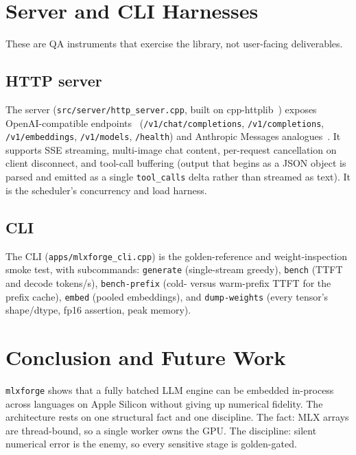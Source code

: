 \documentclass[11pt,a4paper]{report}
\newcommand{\code}[1]{\texttt{#1}}
\begin{document}
\chapter{Server and CLI Harnesses}
\label{ch:apps}

These are QA instruments that exercise the library, not user-facing deliverables.

\section{HTTP server}
The server (\code{src/server/http\_server.cpp}, built on
cpp-httplib~\citep{cpphttplib}) exposes OpenAI-compatible
endpoints~\citep{openai_api} (\code{/v1/chat/completions}, \code{/v1/completions},
\code{/v1/embeddings}, \code{/v1/models}, \code{/health}) and Anthropic Messages
analogues~\citep{anthropic_messages_api}. It supports SSE streaming, multi-image
chat content, per-request cancellation on client disconnect, and tool-call
buffering (output that begins as a JSON object is parsed and emitted as a single
\code{tool\_calls} delta rather than streamed as text). It is the scheduler's
concurrency and load harness.

\section{CLI}
The CLI (\code{apps/mlxforge\_cli.cpp}) is the golden-reference and
weight-inspection smoke test, with subcommands: \code{generate} (single-stream
greedy), \code{bench} (TTFT and decode tokens/s), \code{bench-prefix} (cold-
versus warm-prefix TTFT for the prefix cache), \code{embed} (pooled embeddings),
and \code{dump-weights} (every tensor's shape/dtype, fp16 assertion, peak memory).

\chapter{Conclusion and Future Work}
\label{ch:conclusion}

\code{mlxforge} shows that a fully batched LLM engine can be embedded in-process
across languages on Apple Silicon without giving up numerical fidelity. The
architecture rests on one structural fact and one discipline. The fact: MLX arrays
are thread-bound, so a single worker owns the GPU. The discipline: silent numerical
error is the enemy, so every sensitive stage is golden-gated.
\end{document}
